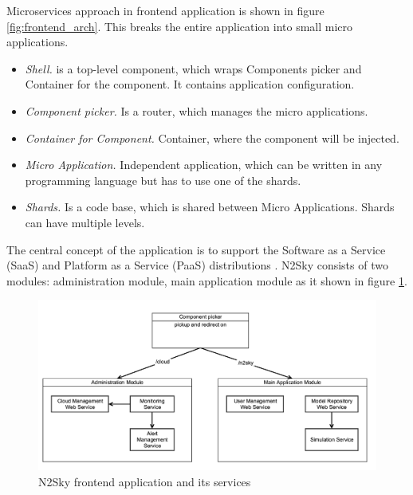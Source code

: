 Microservices approach in frontend application is shown in figure \ref{fig:frontend_arch}. This breaks the entire application into small micro applications.

\begin{itemize}
\item \emph{Shell.}  is a top-level component, which wraps Components picker and Container for the component. It contains application configuration.
\item \emph{Component picker.} Is a router, which manages the micro applications. 
\item \emph{Container for Component.} Container, where the component will be injected.
\item \emph{Micro Application.} Independent application, which can be written in any programming language but has to use one of the shards.
\item \emph{Shards.} Is a code base, which is shared between Micro Applications. Shards can have multiple levels. 
\end{itemize}
 

The central concept of the application is to support the Software as a Service (SaaS) and Platform as a Service (PaaS) distributions \cite{Walraven2014}.  N2Sky consists of two modules: administration module, main application module as it shown in figure \ref{fig:modular_design}.

\begin{figure}[htbp]
\begin{center}
  \includegraphics[width=\linewidth]{components/2/redirector.png}
  \caption{N2Sky frontend application and its services}
  \label{fig:modular_design}
\end{center}
\end{figure}

